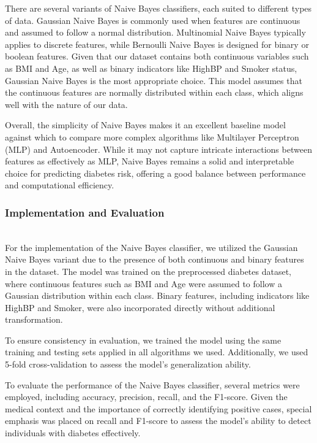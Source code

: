 There are several variants of Naive Bayes classifiers, each suited to different types of data. Gaussian Naive Bayes is commonly used when features are continuous and assumed to follow a normal distribution. Multinomial Naive Bayes typically applies to discrete features, while Bernoulli Naive Bayes is designed for binary or boolean features. Given that our dataset contains both continuous variables such as BMI and Age, as well as binary indicators like HighBP and Smoker status, Gaussian Naive Bayes is the most appropriate choice. This model assumes that the continuous features are normally distributed within each class, which aligns well with the nature of our data.

Overall, the simplicity of Naive Bayes makes it an excellent baseline model against which to compare more complex algorithms like Multilayer Perceptron (MLP) and Autoencoder. While it may not capture intricate interactions between features as effectively as MLP, Naive Bayes remains a solid and interpretable choice for predicting diabetes risk, offering a good balance between performance and computational efficiency.
\newline
\subsubsection{Implementation and Evaluation}\\

For the implementation of the Naive Bayes classifier, we utilized the Gaussian Naive Bayes variant due to the presence of both continuous and binary features in the dataset. The model was trained on the preprocessed diabetes dataset, where continuous features such as BMI and Age were assumed to follow a Gaussian distribution within each class. Binary features, including indicators like HighBP and Smoker, were also incorporated directly without additional transformation.

To ensure consistency in evaluation, we trained the model using the same training and testing sets applied in all algorithms we used. Additionally, we used 5-fold cross-validation to assess the model’s generalization ability.

To evaluate the performance of the Naive Bayes classifier, several metrics were employed, including accuracy, precision, recall, and the F1-score. Given the medical context and the importance of correctly identifying positive cases, special emphasis was placed on recall and F1-score to assess the model's ability to detect individuals with diabetes effectively.

